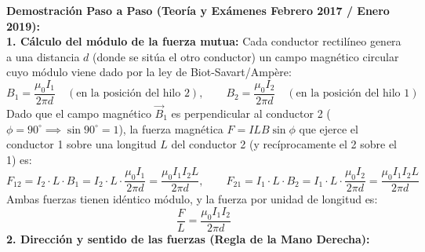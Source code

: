 \begin{ejercicio}
\begin{center}
\end{center}
\textbf{Demostración Paso a Paso (Teoría y Exámenes Febrero 2017 / Enero 2019):}\\[4pt]
\textbf{1. Cálculo del módulo de la fuerza mutua:}
Cada conductor rectilíneo genera a una distancia $d$ (donde se sitúa el otro conductor) un campo magnético circular cuyo módulo viene dado por la ley de Biot-Savart/Ampère:
\begin{equation}
    B_1 = \frac{\mu_0 I_1}{2\pi d} \quad (\text{en la posición del hilo 2}), \qquad B_2 = \frac{\mu_0 I_2}{2\pi d} \quad (\text{en la posición del hilo 1})
\end{equation}
Dado que el campo magnético $\vec{B}_1$ es perpendicular al conductor 2 ($\phi = 90^\circ \implies \sin 90^\circ = 1$), la fuerza magnética $F = I L B \sin\phi$ que ejerce el conductor 1 sobre una longitud $L$ del conductor 2 (y recíprocamente el 2 sobre el 1) es:
\begin{equation}
    F_{12} = I_2 \cdot L \cdot B_1 = I_2 \cdot L \cdot \frac{\mu_0 I_1}{2\pi d} = \frac{\mu_0 I_1 I_2 L}{2\pi d}, \qquad F_{21} = I_1 \cdot L \cdot B_2 = I_1 \cdot L \cdot \frac{\mu_0 I_2}{2\pi d} = \frac{\mu_0 I_1 I_2 L}{2\pi d}
\end{equation}
Ambas fuerzas tienen idéntico módulo, y la fuerza por unidad de longitud es:
\begin{equation}
    \boxed{\frac{F}{L} = \frac{\mu_0 I_1 I_2}{2\pi d}}
\end{equation}
\textbf{2. Dirección y sentido de las fuerzas (Regla de la Mano Derecha):}

\end{ejercicio}
